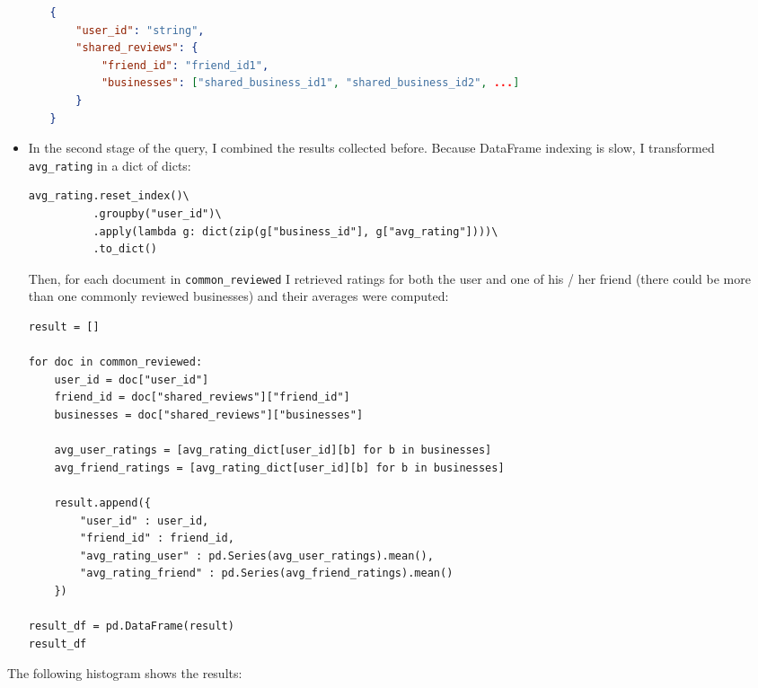 \documentclass{Configuration_Files/PoliMi3i_thesis}
\begin{document}
\begin{itemize}
\begin{itemize}
\begin{lstlisting}[language=json]
{
    "user_id": "string",
    "shared_reviews": {
        "friend_id": "friend_id1",
        "businesses": ["shared_business_id1", "shared_business_id2", ...]
    }
}
\end{lstlisting}
\end{itemize}

\bigskip

\item In the second stage of the query, I combined the results collected before. Because DataFrame indexing is slow, I transformed \texttt{avg\_rating} in a dict of dicts:

\bigskip 

\begin{verbatim}
avg_rating.reset_index()\
          .groupby("user_id")\
          .apply(lambda g: dict(zip(g["business_id"], g["avg_rating"])))\
          .to_dict()
\end{verbatim}

\bigskip

Then, for each document in \texttt{common\_reviewed} I retrieved ratings for both the user and one of his / her friend (there could be more than one commonly reviewed businesses) and their averages were computed: 

\bigskip 

\begin{verbatim}
result = []

for doc in common_reviewed:
    user_id = doc["user_id"]
    friend_id = doc["shared_reviews"]["friend_id"]
    businesses = doc["shared_reviews"]["businesses"]
    
    avg_user_ratings = [avg_rating_dict[user_id][b] for b in businesses]
    avg_friend_ratings = [avg_rating_dict[user_id][b] for b in businesses]
    
    result.append({
        "user_id" : user_id,
        "friend_id" : friend_id,
        "avg_rating_user" : pd.Series(avg_user_ratings).mean(),
        "avg_rating_friend" : pd.Series(avg_friend_ratings).mean()
    })
    
result_df = pd.DataFrame(result)
result_df
\end{verbatim}

\bigskip

\end{itemize}

The following histogram shows the results:

\bigskip
\end{document}

